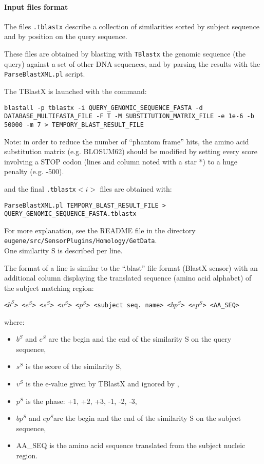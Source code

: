 \paragraph{Input files format}

The files \texttt{.tblastx} describe a collection of similarities
sorted by subject sequence and by position on the query sequence.

These files are obtained by blasting with \texttt{TBlastx} the genomic
sequence (the query) against a set of other DNA sequences, and by
parsing the results with the \texttt{ParseBlastXML.pl} script.

The TBlastX is launched with the command:

\begin{Verbatim}[fontsize=\small]
blastall -p tblastx -i QUERY_GENOMIC_SEQUENCE_FASTA -d
DATABASE_MULTIFASTA_FILE -F T -M SUBSTITUTION_MATRIX_FILE -e 1e-6 -b
50000 -m 7 > TEMPORY_BLAST_RESULT_FILE
\end{Verbatim}

Note: in order to reduce the number of ``phantom frame'' hits, the
amino acid substitution matrix (e.g. BLOSUM62) should be modified by
setting every score involving a STOP codon (lines and column noted
with a star *) to a huge penalty (e.g. -500).

and the final \texttt{.tblastx}$<i>$ files are obtained with:
\begin{Verbatim}[fontsize=\small]
ParseBlastXML.pl TEMPORY_BLAST_RESULT_FILE > QUERY_GENOMIC_SEQUENCE_FASTA.tblastx
\end{Verbatim}

For more explanation, see the README file in the directory\\
\texttt{eugene/src/SensorPlugins/Homology/GetData}.\\

One similarity S is described per line.

The format of a line is similar to the ``.blast'' file format (BlastX
sensor) with an additional column displaying the translated sequence
(amino acid alphabet) of the subject matching region:

\texttt{<$b^S$> <$e^S$> <$s^S$> <$v^S$> <$p^S$> <subject seq. name> <$bp^S$> <$ep^S$> <AA\_SEQ>}

where:
\begin{itemize}
\item $b^S$ and $e^S$ are the begin and the end of the similarity S on the query sequence,
\item $s^S$ is the score of the similarity S,
\item $v^S$ is the e-value given by TBlastX and ignored by \EuGene,
\item $p^S$ is the phase: +1, +2, +3, -1, -2, -3,
\item $bp^S$ and $ep^S$are the begin and the end of the similarity S on the subject sequence,
\item AA\_SEQ is the amino acid sequence translated from the subject nucleic region.
\end{itemize}

